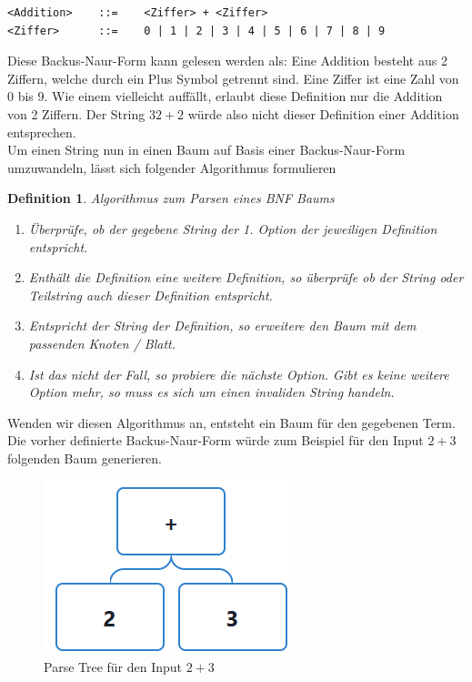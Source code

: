 \documentclass[11pt]{article}
\newtheorem{defin}{Definition}
\begin{document}
\begin{verbatim}
<Addition>    ::=    <Ziffer> + <Ziffer>
<Ziffer>      ::=    0 | 1 | 2 | 3 | 4 | 5 | 6 | 7 | 8 | 9 
\end{verbatim}
Diese Backus-Naur-Form kann gelesen werden als: 
Eine Addition besteht aus 2 Ziffern, 
welche durch ein Plus Symbol getrennt sind. 
Eine Ziffer ist eine Zahl von 0 bis 9. 
Wie einem vielleicht auffällt, erlaubt diese Definition nur 
die Addition von 2 Ziffern. Der String $32+2$ würde also nicht 
dieser Definition einer Addition entsprechen. \newline \\
Um einen String nun in einen Baum auf Basis einer Backus-Naur-Form umzuwandeln, 
lässt sich folgender Algorithmus formulieren

\begin{defin}
  Algorithmus zum Parsen eines BNF Baums
  \begin{enumerate}
    \item Überprüfe, ob der gegebene String der 1. Option der jeweiligen Definition entspricht.
    \item Enthält die Definition eine weitere Definition, so überprüfe ob der String oder Teilstring auch dieser Definition entspricht.
    \item Entspricht der String der Definition, so erweitere den Baum mit dem passenden Knoten / Blatt.
    \item Ist das nicht der Fall, so probiere die nächste Option. Gibt es keine weitere Option mehr, so muss es sich um einen invaliden String handeln.
  \end{enumerate}
\end{defin}

Wenden wir diesen Algorithmus an, 
entsteht ein Baum für den gegebenen Term.
Die vorher definierte Backus-Naur-Form würde 
zum Beispiel für den Input $2+3$ folgenden Baum generieren.

\newpage

\begin{figure}[h]
  \centering
  \includegraphics[scale=0.5]{trees/beispiel_bnf_1.png}
  \caption{Parse Tree für den Input $2+3$}
\end{figure}
\end{document}
